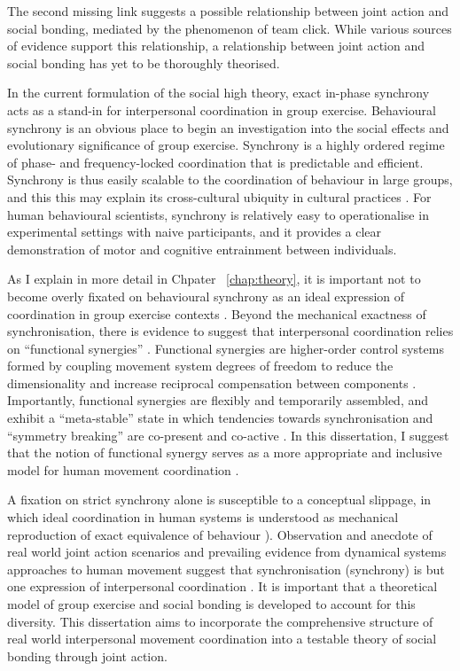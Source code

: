 \begin{CJK}{UTF8}{gbsn}
The second missing link suggests a possible relationship between joint action and social bonding, mediated by the phenomenon of team click.  While various sources of evidence support this relationship, a relationship between joint action and social bonding has yet to be thoroughly theorised.

In the current formulation of the social high theory, exact in-phase synchrony acts as a stand-in for interpersonal coordination in group exercise.  Behavioural synchrony is an obvious place to begin an investigation into the social effects and evolutionary significance of group exercise.  Synchrony is a highly ordered regime of phase- and frequency-locked coordination that is predictable and efficient. Synchrony is thus easily scalable to the coordination of behaviour in large groups, and this this may explain its cross-cultural ubiquity in cultural practices \citep{Dunbar2010,Tarr2016}.  For human behavioural scientists, synchrony is relatively easy to operationalise in experimental settings with naive participants, and it provides a clear demonstration of motor and cognitive entrainment between individuals.

As I explain in more detail in Chpater ~\ref{chap:theory}, it is important not to become overly fixated on behavioural synchrony as an ideal expression of coordination in group exercise contexts \citep{Keller2014,Fusaroli2014}.  Beyond the mechanical exactness of synchronisation, there is evidence to suggest
that interpersonal coordination relies on ``functional synergies'' \citep{Riley2011,Turvey1990}.  Functional synergies are higher-order control systems formed by coupling movement system degrees of freedom to reduce the dimensionality and increase reciprocal compensation between components \citep{Turvey1978}. Importantly, functional synergies are flexibly and temporarily assembled, and exhibit a ``meta-stable'' state in which tendencies towards synchronisation and ``symmetry breaking'' are co-present and co-active \citep{Richardson2015}.  In this dissertation, I suggest that the notion of functional synergy serves as a more appropriate and inclusive model for human movement coordination \citep{Fusaroli2014}.

A fixation on strict synchrony alone is susceptible to a conceptual slippage, in which ideal coordination in human systems is understood as mechanical reproduction of exact equivalence of behaviour \citep[imagine an interpersonal version of the ``Dark Room Dilemma'' in neurocognition, cf.][]{Clark2013}).  Observation and anecdote of real world joint action scenarios and prevailing evidence from dynamical systems approaches to human movement suggest that synchronisation (synchrony) is but one expression of interpersonal coordination \citep{Kelso2013}.  It is important that a theoretical model of group exercise and social bonding is developed to account for this diversity.  This dissertation aims to incorporate the comprehensive structure of real world interpersonal movement coordination into a testable theory of social bonding through joint action.


\end{CJK}
